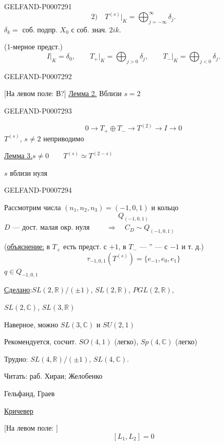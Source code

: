 \begin{GelfandAdjacentEvidence}{GELFAND-P000729}{1}
\[
2)\quad T^{(s)}\big|_K=\bigoplus_{j=-\infty}^{\infty}\delta_j.
\]
\(\delta_k={}\) соб. подпр. \(X_0\) с соб. знач. \(2ik\).

(1-мерное предст.)
\[
I\big|_K=\delta_0,\qquad
T_+\big|_K=\bigoplus_{j>0}\delta_j,\qquad
T_-\big|_K=\bigoplus_{j<0}\delta_j.
\]
\end{GelfandAdjacentEvidence}
\begin{GelfandAdjacentEvidence}{GELFAND-P000729}{2}


[На левом поле: В?] \underline{Лемма 2.} Вблизи \(s=2\)
\end{GelfandAdjacentEvidence}
\begin{GelfandAdjacentEvidence}{GELFAND-P000729}{3}

\[
0\longrightarrow T_+\oplus T_-\longrightarrow T^{(2)}\longrightarrow I\longrightarrow0
\]
\(T^{(s)}\), \(s\ne2\) неприводимо

\underline{Лемма 3.}\quad \(s\ne0\qquad T^{(s)}\simeq T^{(2-s)}\)

\(s\) вблизи нуля
\end{GelfandAdjacentEvidence}
\begin{GelfandAdjacentEvidence}{GELFAND-P000729}{4}


Рассмотрим числа \((n_1,n_2,n_3)=(-1,0,1)\) и кольцо
\[
Q_{(-1,0,1)}
\]
\(D\) --- дост. малая окр. нуля \(\qquad\Rightarrow\quad C_D\sim Q_{(-1,0,1)}\)

(\underline{объяснение:} в \(T_+\) есть предст. с \(+1\), в \(T_-\) --- '' --- с \(-1\) и т. д.)
\[
\tau_{-1,0,1}(T^{(s)})=\{e_{-1},e_0,e_1\}
\]
\(q\in Q_{-1,0,1}\)

\par\smallskip\noindent\dotfill\par\smallskip

\underline{Сделано}:\quad \(SL(2,\mathbb R)/(\pm1)\), \(SL(2,\mathbb R)\), \(PGL(2,\mathbb R)\),

\(SL(2,\mathbb C)\), \(SL(3,\mathbb R)\)

Наверное, можно \(SL(3,\mathbb C)\) и \(SU(2,1)\)

Рекомендуется, сосчит. \(SO(4,1)\) (легко), \(Sp(4,\mathbb C)\) (легко)

Трудно: \(SL(4,\mathbb R)/(\pm1)\), \(SL(4,\mathbb C)\).

Читать: раб. Хираи; Желобенко

Гельфанд, Граев

\underline{Кричевер}


[На левом поле: ]
\[
[L_1,L_2]=0
\]
\end{GelfandAdjacentEvidence}
